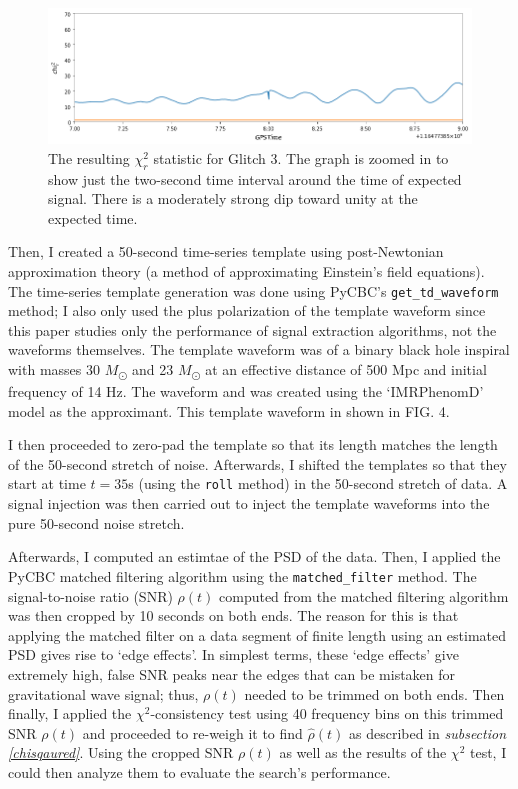 \documentclass[preprint,
letterpaper,
 amsmath,amssymb,
 aps,
]{revtex4-2}
\def\code#1{\texttt{#1}}
\begin{document}
\begin{figure}[t]
\includegraphics[width = .9\textwidth]{chi2 glitch 3.png}
\caption{The resulting $\chi^2_r$ statistic for Glitch 3. The graph is zoomed in to show just the two-second time interval around the time of expected signal. There is a moderately strong dip toward unity at the expected time.}
\centering
\end{figure} 

Then, I created a 50-second time-series template using post-Newtonian approximation theory (a method of approximating Einstein's field equations). The time-series template generation was done using PyCBC's \code{get\_td\_waveform} method; I also only used the plus polarization of the template waveform since this paper studies only the performance of signal extraction algorithms, not the waveforms themselves. The template waveform was of a binary black hole inspiral with masses 30 $M$\textsubscript{\(\odot\)} and 23 $M$\textsubscript{\(\odot\)} at an effective distance of 500 Mpc and initial frequency of 14 Hz. The waveform and was created using the `IMRPhenomD' model as the approximant. This template waveform in shown in FIG. 4.


I then proceeded to zero-pad the template so that its length matches the length of the 50-second stretch of noise. Afterwards, I shifted the templates so that they start at time $t=35$s (using the \code{roll} method) in the 50-second stretch of data. A signal injection was then carried out to inject the template waveforms into the pure 50-second noise stretch. 

Afterwards, I computed an estimtae of the PSD of the data. Then, I applied the PyCBC matched filtering algorithm using the \code{matched\_filter} method. The signal-to-noise ratio (SNR) $\rho (t)$ computed from the matched filtering algorithm was then cropped by 10 seconds on both ends. The reason for this is that applying the matched filter on a data segment of finite length using an estimated PSD gives rise to `edge effects'. In simplest terms, these `edge effects' give extremely high, false SNR peaks near the edges that can be mistaken for gravitational wave signal; thus, $\rho(t)$ needed to be trimmed on both ends. Then finally, I applied the $\chi^2$-consistency test using 40 frequency bins on this trimmed SNR $\rho(t)$ and proceeded to re-weigh it to find $\hat{\rho}(t)$ as described in \textit{subsection \ref{chisqaured}}. Using the cropped SNR $\rho(t)$ as well as the results of the $\chi^2$ test, I could then analyze them to evaluate the search's performance. 
\end{document}
